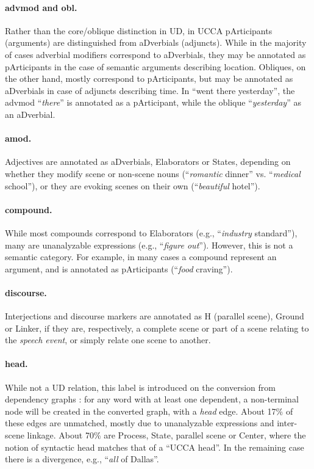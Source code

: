 \documentclass[11pt,a4paper]{article}
\begin{document}
\paragraph{advmod and obl.}
Rather than the core/oblique distinction in UD,
in UCCA pArticipants (arguments) are distinguished from aDverbials (adjuncts).
While in the majority of cases adverbial modifiers correspond to aDverbials,
they may be annotated as pArticipants in the case of semantic arguments describing location.
Obliques, on the other hand, mostly correspond to pArticipants, but may be
annotated as aDverbials in case of adjuncts describing time.
In ``went there yesterday'', the advmod ``\textit{there}'' is annotated as a pArticipant,
while the oblique ``\textit{yesterday}'' as an aDverbial.

\paragraph{amod.}
Adjectives are annotated as aDverbials, Elaborators or States,
depending on whether they modify scene or non-scene nouns
(``\textit{romantic} dinner'' vs. ``\textit{medical} school''), or
they are evoking scenes on their own (``\textit{beautiful} hotel'').

\paragraph{compound.}
While most compounds correspond to Elaborators (e.g., ``\textit{industry} standard''),
many are unanalyzable expressions (e.g., ``\textit{figure out}'').
However, this is not a semantic category.
For example, in many cases a compound represent an argument,
and is annotated as pArticipants (``\textit{food} craving'').

\paragraph{discourse.}
Interjections and discourse markers are annotated as H (parallel scene), Ground or Linker,
if they are, respectively, a complete scene or part of a scene relating to the \textit{speech event},
or simply relate one scene to another.

\paragraph{head.}
While not a UD relation, this label is introduced on the conversion from dependency graphs
\cite{hershcovich2018multitask}: for any word with at least one dependent,
a non-terminal node will be created in the converted graph, with a \textit{head} edge.
About 17\% of these edges are unmatched, mostly due to unanalyzable expressions and inter-scene linkage.
About 70\% are Process, State, parallel scene or Center,
where the notion of syntactic head matches that of a ``UCCA head''.
In the remaining case there is a divergence, e.g., ``\textit{all} of Dallas''.
\end{document}
